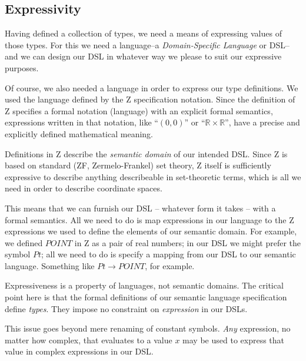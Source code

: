 \documentclass[reqno,12pt]{tufte-handout}
\numberwithin{equation}{subsection}
\numberwithin{equation}{subsection}
\newcommand\cspace{coordinate space}
\newcommand\RR{\(\mathds{R}\times\mathds{R}\)}
\begin{document}
\subsection{Expressivity}
\label{sect:expr}

Having defined a collection of types, we need a means of expressing
values of those types.  For this we need a language--a
\textit{Domain-Specific Language} or DSL--and we can design our DSL in
whatever way we please to suit our expressive purposes.

Of course, we also needed a language in order to express our type
definitions.  We used the language defined by the Z specification
notation. Since the definition of Z
specifies a formal notation (language) with an explicit formal
semantics, expressions written in that notation, like ``\((0,0)\)'' or
``\RR'', have a precise and explicitly defined mathematical meaning.

Definitions in Z describe the \textit{semantic domain} of our intended
DSL.  Since Z is based on standard (ZF, Zermelo-Frankel) set theory, Z
itself is sufficiently expressive to describe anything describeable in
set-theoretic terms, which is all we need in order to
describe \cspace{}s.

This means that we can furnish our DSL -- whatever form it takes --
with a formal semantics.  All we need to do is map expressions in our
language to the Z expressions we used to define the elements of our
semantic domain.  For example, we defined \(POINT\) in Z as a pair of
real numbers; in our DSL we might prefer the symbol \(Pt\); all we
need to do is specify a mapping from our DSL to our semantic
language. Something like \(Pt\rightarrow POINT\), for
example.

Expressiveness is a property of languages, not semantic domains.  The
critical point here is that the formal definitions of our semantic
language specification define \textit{types}.  They impose no
constraint on \textit{expression} in our DSLs.

This issue goes beyond mere renaming of constant symbols.
\textit{Any} expression, no matter how complex, that evaluates to a
value $x$ may be used to express that value in complex expressions in
our DSL.
\end{document}
